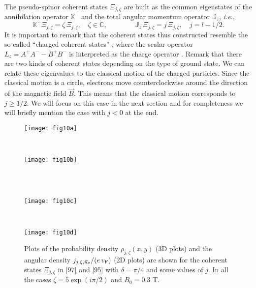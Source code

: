 \documentclass[aps,showpacs,showkeys]{revtex4}
\begin{document}
The pseudo-spinor coherent states $\Xi_{j,\zeta}$ are built as the common eigenstates of the annihilation operator $\mathbb{K}^-$ and the total angular momentum operator $\mathbb{J}_z$, {\it i.e.},
\begin{equation}
\mathbb{K}^-  \Xi_{j,\zeta} =\zeta\, \Xi_{j,\zeta}, \quad  \zeta\in\mathbb{C}, \qquad\qquad 
	\mathbb{J}_z\, \Xi_{j,\zeta} =j\, \Xi_{j,\zeta}, \quad  j=l-1/2. \label{94b}
\end{equation}
It is important to remark that the coherent states thus constructed resemble the so-called ``charged coherent states'' \cite{bbdr76}, where the scalar operator $L_z=A^+A^--B^+B^-$ is interpreted as the charge operator \cite{f04,ahb15}. Remark that there are two kinds of coherent states depending on the type of ground state. We can relate these eigenvalues to the classical motion of the charged particles. Since the classical motion is a circle, electrons move counterclockwise around the direction of the magnetic field $\vec{B}$. This means that the classical motion corresponds to $j\geq1/2$. We will focus on this case in the next section and for completeness we will briefly mention the case with $j<0$ at the end.

\begin{figure}[htb]
	\centering
	\begin{minipage}[b]{0.33\textwidth}
		\texttt{[image: fig10a]}\\
		\label{fig:jtheta1P_zl_1}
	\end{minipage}
	\hspace{3cm}
	~ 
	\begin{minipage}[b]{0.33\textwidth}
		\texttt{[image: fig10b]}\\
		\label{fig:jtheta1P_zl_2}
	\end{minipage}
	\\ [2ex]
	~ %
	\begin{minipage}[b]{0.33\textwidth}
		\texttt{[image: fig10c]}
		\\
		\label{fig:jtheta1P_zl_3}
	\end{minipage}
	\hspace{3cm}
	~ %
	\begin{minipage}[b]{0.33\textwidth}
		\texttt{[image: fig10d]}\\
		\label{fig:H1P_z}
	\end{minipage}
	\caption{\label{fig:rho1P_z} Plots of the probability density $\rho_{j,\zeta}(x,y)$ (3D plots) and the 
		angular density $j_{j,\zeta,\vec{u}_\theta}/(e\,v_{\rm F})$ (2D plots) are shown for the coherent states $\Xi_{j,\zeta}$ in \eqref{97} and \eqref{95} with $\delta=\pi/4$ and some values of $j$. In all the cases $\zeta=5\exp(i\pi/2)$ and $B_{0}=0.3$ T.}
\end{figure}
\end{document}
